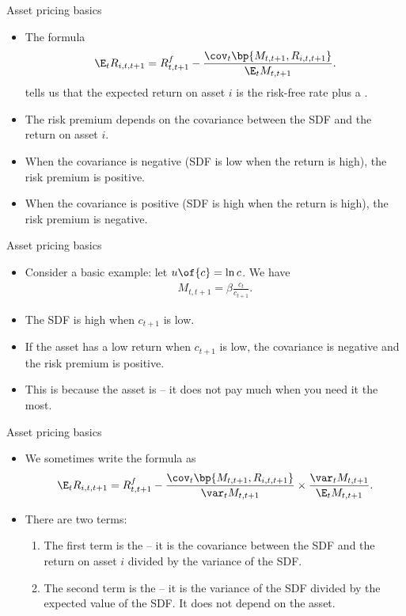 \documentclass[11pt,xcolor={dvipsnames},aspectratio=159,hyperref={pdftex,pdfpagemode=UseNone,hidelinks,pdfdisplaydoctitle=true},usepdftitle=false]{beamer}
\begin{document}
\begin{frame}{Asset pricing basics}  
    \begin{itemize}
        \item The formula          \begin{align*}
            \E_t R_{i,t,t+1} = R^f_{t,t+1} - \frac{\cov_t \bp{M_{t,t+1}, R_{i,t,t+1}}}{\E_t M_{t,t+1}}.
        \end{align*}
        tells us that the expected return on asset $i$ is the risk-free rate plus a .
        \item The risk premium depends on the covariance between the SDF and the return on asset $i$.
        \item When the covariance is negative (SDF is low when the return is high), the risk premium is positive. 
        \item When the covariance is positive (SDF is high when the return is high), the risk premium is negative.
\end{itemize}
\end{frame}

\begin{frame}{Asset pricing basics}  
    \begin{itemize}
        \item Consider a basic example: let $u\of{c} = \ln c$. We have \begin{align*}
            M_{t,t+1} = \beta \frac{c_{t}}{c_{t+1}}.
        \end{align*}
        \item The SDF is high when $c_{t+1}$ is low.
        \item If the asset has a low return when $c_{t+1}$ is low, the covariance is negative and the risk premium is positive.
        \item This is because the asset is  -- it does not pay much when you need it the most. 
\end{itemize}
\end{frame}

\begin{frame}{Asset pricing basics}  
    \begin{itemize}
        \item We sometimes write the formula as
            \begin{align*}
            \E_t R_{i,t,t+1} = R^f_{t,t+1} - \frac{\cov_t \bp{M_{t,t+1}, R_{i,t,t+1}}}{\var_t M_{t,t+1}} \times \frac{\var_t M_{t,t+1}}{\E_t M_{t,t+1}}.
        \end{align*}
        \item There are two terms: \begin{enumerate}
            \item The first term is the  -- it is the covariance between the SDF and the return on asset $i$ divided by the variance of the SDF.
            \item The second term is the  -- it is the variance of the SDF divided by the expected value of the SDF. It does not depend on the asset.
        \end{enumerate}
    \end{itemize}
\end{frame}
\end{document}
